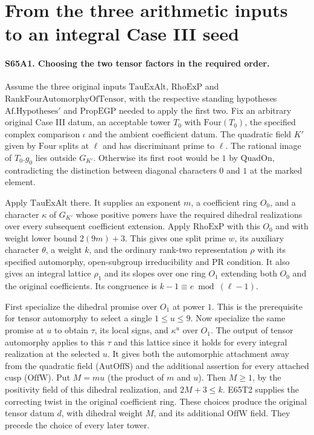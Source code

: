 \section{From the three arithmetic inputs to an integral Case III seed}

\paragraph{S65A1. Choosing the two tensor factors in the required order.}
Assume the three original inputs
$\mathrm{TauExAlt}$, $\mathrm{RhoExP}$ and
$\mathrm{RankFourAutomorphyOfTensor}$, with the respective standing
hypotheses $\mathrm{Af.Hypotheses}'$ and $\mathrm{PropEGP}$ needed
to apply the first two. Fix an arbitrary original Case III datum,
an acceptable tower $T_0$ with $\mathrm{Four}(T_0)$, the specified
complex comparison $\iota$ and the ambient coefficient datum.
The quadratic field $K'$ given by $\mathrm{Four}$ splits at $\ell$
and has discriminant prime to $\ell$. The rational image of $T_0.g_0$
lies outside $G_{K'}$. Otherwise its first root would be $1$ by
$\mathrm{QuadOn}$, contradicting the distinction between diagonal
characters $0$ and $1$ at the marked element.

Apply $\mathrm{TauExAlt}$ there. It supplies an exponent $m$, a
coefficient ring $O_0$, and a character $\kappa$ of $G_{K'}$ whose
positive powers have the required dihedral realizations over every
subsequent coefficient extension. Apply $\mathrm{RhoExP}$ with
this $O_0$ and with weight lower bound $2(9m)+3$. This gives one split
prime $w$, its auxiliary character $\theta$, a weight $k$, and the
ordinary rank-two representation $\rho$ with its specified automorphy,
open-subgroup irreducibility and $\mathrm{PR}$ condition. It also
gives an integral lattice $\rho_1$ and its slopes over one ring
$O_1$ extending both $O_0$ and the original coefficients. Its
congruence is $k-1\equiv e\bmod(\ell-1)$.

First specialize the dihedral promise over $O_1$ at power $1$.
This is the prerequisite for tensor automorphy to select a single
$1\le u\le9$. Now specialize the same promise at $u$ to obtain
$\tau$, its local signs, and $\kappa^u$ over $O_1$. The output of
tensor automorphy applies to this $\tau$ and this lattice since it
holds for every integral realization at the selected $u$. It gives
both the automorphic attachment away from the quadratic field
($\mathrm{AutOffS}$) and the additional assertion for every attached
cusp ($\mathrm{OffW}$). Put $M=mu$ (the product of $m$ and $u$).
Then $M\ge1$, by the positivity field of this dihedral realization,
and $2M+3\le k$. E65T2 supplies the correcting twist in the
original coefficient ring. These choices produce the original tensor
datum $d$, with dihedral weight $M$, and its additional $\mathrm{OffW}$
field. They precede the choice of every later tower.

